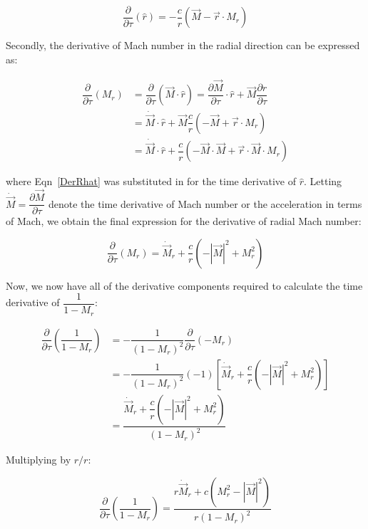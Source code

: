 \documentclass[]{aiaa-tc}%
\begin{document}
\begin{equation} \label{DerRhat}
\dfrac{\partial}{\partial\tau} \left( \hat{r} \right)
= -\dfrac{c}{r} \left( \vec{M} - \vec{r} \cdot M_r \right)
\end{equation}


Secondly, the derivative of Mach number in the radial direction can be expressed as:

\begin{align*}
\dfrac{\partial}{\partial\tau} \left( M_r \right)
&= \dfrac{\partial}{\partial\tau} \left( \vec{M} \cdot \hat{r} \right)
= \dfrac{\partial\vec{M}}{\partial\tau}
    \cdot\hat{r} + \vec{M} \dfrac{\partial\hat{r}}{\partial\tau} \\
&= \dot{\vec{M}}\cdot\hat{r} + \vec{M} \dfrac{c}{r}
    \left( -\vec{M} + \vec{r} \cdot M_r \right) \\
&= \dot{\vec{M}}\cdot\hat{r} + \dfrac{c}{r}
    \left( -\vec{M}\cdot\vec{M} + \vec{r} \cdot\vec{M}\cdot M_r \right)
\end{align*}

\noindent where Eqn~\ref{DerRhat} was substituted in for the time derivative of $\hat{r}$.  Letting $\dot{\vec{M}} = \dfrac{\partial \vec{M}}{\partial \tau}$ denote the time derivative of Mach number or the acceleration in terms of Mach, we obtain the final expression for the derivative of radial Mach number:

\begin{equation} \label{DerMr}
\dfrac{\partial}{\partial\tau} \left( M_r \right)
= \dot{\vec{M}}_r + \dfrac{c}{r}
    \left( -|\vec{M}|^2 + M_r^2 \right)
\end{equation}

Now, we now have all of the derivative components required to calculate the time derivative of $\dfrac{1}{1 - M_r}$:

\begin{align*}
\dfrac{\partial}{\partial\tau} \left( \dfrac{1}{1 - M_r} \right)
&= -\dfrac{1}{(1 - M_r)^2} \dfrac{\partial}{\partial\tau}(-M_r) \\
&= -\dfrac{1}{(1 - M_r)^2}(-1) \left[
    \dot{\vec{M}}_r +\dfrac{c}{r}\left( -|\vec{M}|^2 + M_r^2 \right) \right] \\
&= \dfrac{ \dot{\vec{M}}_r + \dfrac{c}{r} \left( -|\vec{M}|^2 + M_r^2 \right) }
    {(1 - M_r)^2}
\end{align*}

\noindent Multiplying by $r/r$:

\begin{equation} \label{DerMrDenom}
\dfrac{\partial}{\partial\tau} \left( \dfrac{1}{1 - M_r} \right)
= \dfrac{ r\dot{\vec{M}}_r + c \left( M_r^2 - |\vec{M}|^2 \right) }
    {r (1 - M_r)^2}
\end{equation}
\end{document}
